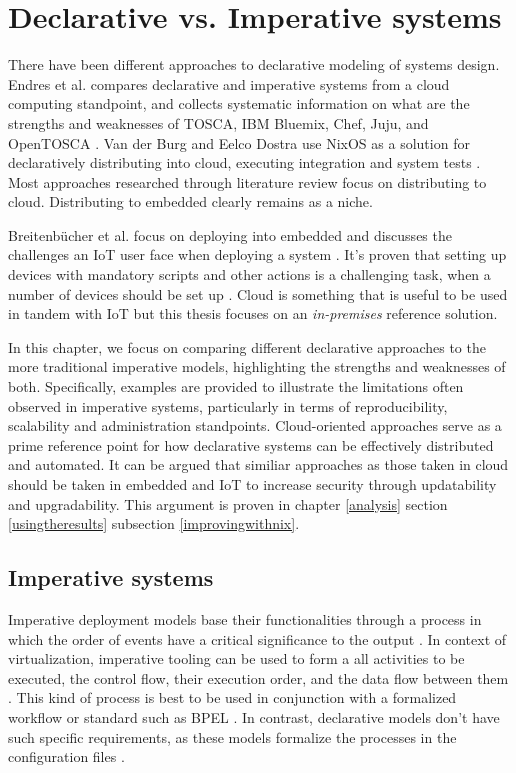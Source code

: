 \chapter{Declarative vs. Imperative systems} \label{imperative}

There have been different approaches to declarative modeling of
systems design. Endres et al. compares declarative and imperative
systems from a cloud computing standpoint, and collects systematic
information on what are the strengths and weaknesses of TOSCA, IBM
Bluemix, Chef, Juju, and OpenTOSCA \cite{endres2017declarative}. Van
der Burg and Eelco Dostra use NixOS as a solution for declaratively
distributing into cloud, executing integration and system tests
\cite{van2010declarative}. Most approaches researched through
literature review focus on distributing to cloud. Distributing to
embedded clearly remains as a niche.

Breitenbücher et al. focus on deploying into embedded and discusses
the challenges an IoT user face when deploying a system \cite{breitenbucher2017declarative}. It's proven
that setting up devices with mandatory scripts and other actions is a
challenging task, when a number of devices should be set up \cite{breitenbucher2017declarative}. Cloud is
something that is useful to be used in tandem with IoT but this thesis
focuses on an \textit{in-premises} reference
solution. 

In this chapter, we focus on comparing different declarative
approaches to the more traditional imperative models, highlighting the
strengths and weaknesses of both. Specifically, examples are provided
to illustrate the limitations often observed in imperative systems,
particularly in terms of reproducibility, scalability and
administration standpoints. Cloud-oriented approaches serve as a prime
reference point for how declarative systems can be effectively
distributed and automated. It can be argued that similiar approaches
as those taken in cloud should be taken in embedded and IoT to
increase security through updatability and upgradability. This
argument is proven in chapter \ref{analysis} section \ref{usingtheresults}
subsection \ref{improvingwithnix}.

\section{Imperative systems}

Imperative deployment models base their functionalities through a
process in which the order of events have a critical significance to
the output \cite{breitenbucher2017declarative}. In context of
virtualization, imperative tooling can be used to form a all
activities to be executed, the control flow, their execution order,
and the data flow between them \cite{endres2017declarative}. This kind
of process is best to be used in conjunction with a formalized
workflow or standard such as BPEL \cite{endres2017declarative}. In
contrast, declarative models don't have such specific requirements, as
these models formalize the processes in the configuration files
\cite{endres2017declarative}.

